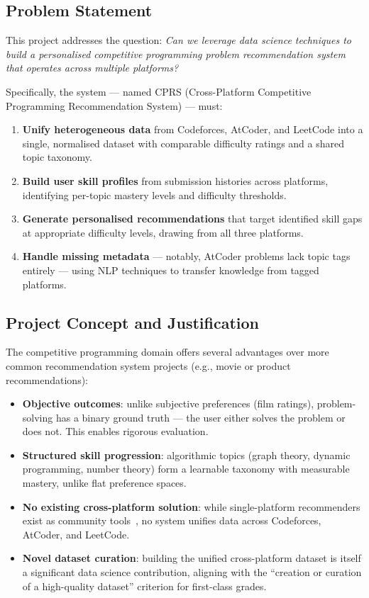 \documentclass[12pt,a4paper]{article}
\begin{document}
\subsection{Problem Statement}

This project addresses the question: \emph{Can we leverage data science techniques to build a personalised competitive programming problem recommendation system that operates across multiple platforms?}

Specifically, the system --- named CPRS (Cross-Platform Competitive Programming Recommendation System) --- must:

\begin{enumerate}
    \item \textbf{Unify heterogeneous data} from Codeforces, AtCoder, and LeetCode into a single, normalised dataset with comparable difficulty ratings and a shared topic taxonomy.
    \item \textbf{Build user skill profiles} from submission histories across platforms, identifying per-topic mastery levels and difficulty thresholds.
    \item \textbf{Generate personalised recommendations} that target identified skill gaps at appropriate difficulty levels, drawing from all three platforms.
    \item \textbf{Handle missing metadata} --- notably, AtCoder problems lack topic tags entirely --- using NLP techniques to transfer knowledge from tagged platforms.
\end{enumerate}

\subsection{Project Concept and Justification}

The competitive programming domain offers several advantages over more common recommendation system projects (e.g., movie or product recommendations):

\begin{itemize}
    \item \textbf{Objective outcomes}: unlike subjective preferences (film ratings), problem-solving has a binary ground truth --- the user either solves the problem or does not. This enables rigorous evaluation.
    \item \textbf{Structured skill progression}: algorithmic topics (graph theory, dynamic programming, number theory) form a learnable taxonomy with measurable mastery, unlike flat preference spaces.
    \item \textbf{No existing cross-platform solution}: while single-platform recommenders exist as community tools~\cite{ahmed2023}, no system unifies data across Codeforces, AtCoder, and LeetCode.
    \item \textbf{Novel dataset curation}: building the unified cross-platform dataset is itself a significant data science contribution, aligning with the ``creation or curation of a high-quality dataset'' criterion for first-class grades.
\end{itemize}
\end{document}
